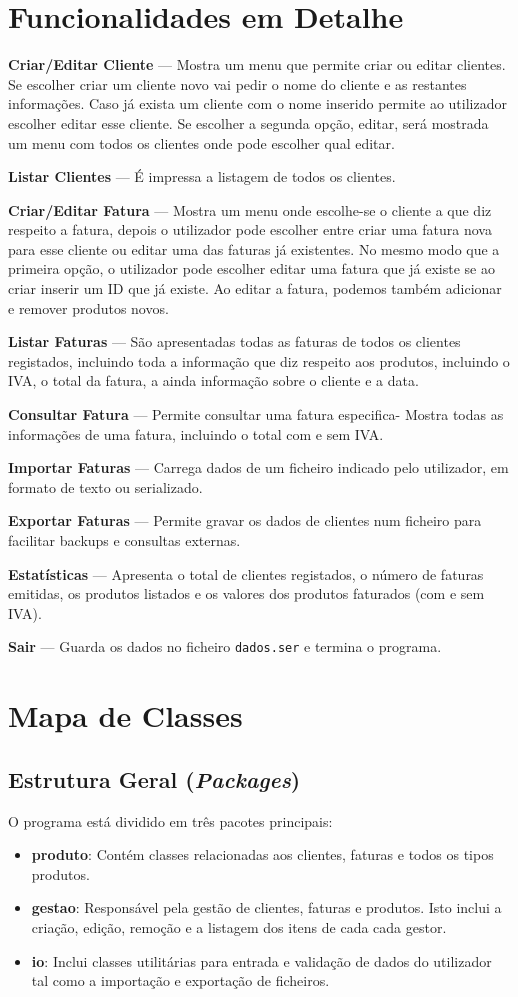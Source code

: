 \documentclass[a4paper, 11pt]{article}
\newcommand\ssection[1]{\section{#1} }
\newcommand\sssection[1]{ \subsection*{\color{MidnightBlue}#1}\vspace{-2ex} }
\begin{document}
\ssection{Funcionalidades em Detalhe}
\textbf{Criar/Editar Cliente} --- Mostra um menu que permite criar ou editar clientes. Se escolher criar um cliente novo vai pedir o nome do cliente e as restantes informações. Caso já exista um cliente com o nome inserido permite ao utilizador escolher editar esse cliente. Se escolher a segunda opção, editar, será mostrada um menu com todos os clientes onde pode escolher qual editar.

\textbf{Listar Clientes} --- É impressa a listagem de todos os clientes.

\textbf{Criar/Editar Fatura} --- Mostra um menu onde escolhe-se o cliente a que diz respeito a fatura, depois o utilizador pode escolher entre criar uma fatura nova para esse cliente ou editar uma das faturas já existentes. No mesmo modo que a primeira opção, o utilizador pode escolher editar uma fatura que já existe se ao criar inserir um ID que já existe. Ao editar a fatura, podemos também adicionar e remover produtos novos.

\textbf{Listar Faturas} --- São apresentadas todas as faturas de todos os clientes registados, incluindo toda a informação que diz respeito aos produtos, incluindo o IVA, o total da fatura, a ainda informação sobre o cliente e a data.  

\textbf{Consultar Fatura} --- Permite consultar uma fatura especifica- Mostra todas as informações de uma fatura, incluindo o total com e sem IVA.

\textbf{Importar Faturas} --- Carrega dados de um ficheiro indicado pelo utilizador, em formato de texto ou serializado.

\textbf{Exportar Faturas} --- Permite gravar os dados de clientes num ficheiro para facilitar backups e consultas externas.

\textbf{Estatísticas} --- Apresenta o total de clientes registados, o número de faturas emitidas, os produtos listados e os valores dos produtos faturados (com e sem IVA).

\textbf{Sair} --- Guarda os dados no ficheiro \texttt{dados.ser} e termina o programa.

\ssection{Mapa de Classes}
\sssection{Estrutura Geral (\textit{Packages})}
O programa está dividido em três pacotes principais:
\begin{itemize}
    \item \textbf{produto}: Contém classes relacionadas aos clientes, faturas e todos os tipos produtos.
    \item \textbf{gestao}: Responsável pela gestão de clientes, faturas e produtos. Isto inclui a criação, edição, remoção e a listagem dos itens de cada cada gestor.
    \item \textbf{io}: Inclui classes utilitárias para entrada e validação de dados do utilizador tal como a importação e exportação de ficheiros.
\end{itemize}
\end{document}

